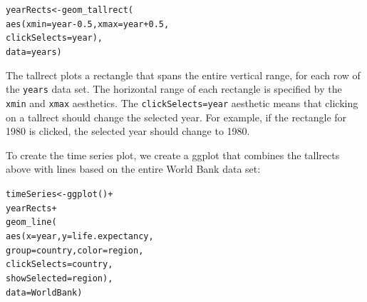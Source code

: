 \documentclass[12pt]{article}\usepackage[]{graphicx}\usepackage[]{color}
\makeatletter
\newcommand{\hlnum}[1]{\textcolor[rgb]{0,0,0}{#1}}%
\newcommand{\hlopt}[1]{\textcolor[rgb]{0,0,0}{#1}}%
\newcommand{\hlstd}[1]{\textcolor[rgb]{0,0,0}{#1}}%
\newcommand{\hlkwb}[1]{\textcolor[rgb]{0,0,0}{#1}}%
\newcommand{\hlkwc}[1]{\textcolor[rgb]{0,0,1}{#1}}%
\newcommand{\hlkwd}[1]{\textcolor[rgb]{0,0,0}{#1}}%
\newenvironment{kframe}{%
 \def\at@end@of@kframe{}%
 \ifinner\ifhmode%
  \def\at@end@of@kframe{\end{minipage}}%
  \begin{minipage}{\columnwidth}%
 \fi\fi%
 \def\FrameCommand##1{\hskip\@totalleftmargin \hskip-\fboxsep
 \colorbox{shadecolor}{##1}\hskip-\fboxsep
     \hskip-\linewidth \hskip-\@totalleftmargin \hskip\columnwidth}%
 \MakeFramed {\advance\hsize-\width
   \@totalleftmargin\z@ \linewidth\hsize
   \@setminipage}}%
 {\par\unskip\endMakeFramed%
 \at@end@of@kframe}
\newenvironment{knitrout}{}{} %
\makeatother
\begin{document}
\begin{knitrout}
\color{fgcolor}\begin{kframe}
\begin{alltt}
\hlstd{yearRects} \hlkwb{<-} \hlkwd{geom_tallrect}\hlstd{(}
  \hlkwd{aes}\hlstd{(}\hlkwc{xmin}\hlstd{=year}\hlopt{-}\hlnum{0.5}\hlstd{,} \hlkwc{xmax}\hlstd{=year}\hlopt{+}\hlnum{0.5}\hlstd{,}
      \hlkwc{clickSelects}\hlstd{=year),}
  \hlkwc{data}\hlstd{=years)}
\end{alltt}
\end{kframe}
\end{knitrout}

The tallrect plots a rectangle that spans the entire vertical range,
for each row of the \texttt{years} data set. The horizontal range of
each rectangle is specified by the \texttt{xmin} and \texttt{xmax}
aesthetics. The \texttt{clickSelects=year} aesthetic means that
clicking on a tallrect should change the selected year. For example,
if the rectangle for 1980 is clicked, the selected year should change
to 1980.





To create the time series plot, we create a ggplot that combines the
tallrects above with lines based on the entire World Bank data set:

\begin{knitrout}
\color{fgcolor}\begin{kframe}
\begin{alltt}
\hlstd{timeSeries} \hlkwb{<-} \hlkwd{ggplot}\hlstd{()}\hlopt{+}
  \hlstd{yearRects}\hlopt{+}
  \hlkwd{geom_line}\hlstd{(}
    \hlkwd{aes}\hlstd{(}\hlkwc{x}\hlstd{=year,} \hlkwc{y}\hlstd{=life.expectancy,}
        \hlkwc{group}\hlstd{=country,} \hlkwc{color}\hlstd{=region,}
        \hlkwc{clickSelects}\hlstd{=country,}
        \hlkwc{showSelected}\hlstd{=region),}
    \hlkwc{data}\hlstd{=WorldBank)}
\end{alltt}
\end{kframe}
\end{knitrout}
\end{document}
